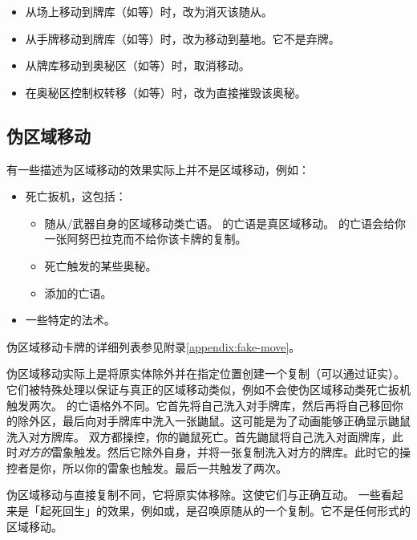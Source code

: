 \begin{itemize}
    \item 从场上移动到牌库（如等）时，改为消灭该随从。
    \item 从手牌移动到牌库（如等）时，改为移动到墓地。它不是弃牌。
\end{itemize}

\begin{itemize}
    \item 从牌库移动到奥秘区（如等）时，取消移动。
    \item 在奥秘区控制权转移（如等）时，改为直接摧毁该奥秘。
\end{itemize}

\subsection{伪区域移动}

有一些描述为区域移动的效果实际上并不是区域移动，例如：

\begin{itemize}
    \item 死亡扳机，这包括：
    \begin{itemize}
        \item 随从/武器自身的区域移动类亡语。
            \exception {}的亡语是真区域移动。
            \exception {}的亡语会给你一张阿努巴拉克而不给你该卡牌的复制。
        \item 死亡触发的某些奥秘。
        \item {}添加的亡语。
    \end{itemize}
    \item 一些特定的法术。
\end{itemize}
伪区域移动卡牌的详细列表参见附录\ref{appendix:fake-move}。

伪区域移动实际上是将原实体除外并在指定位置创建一个复制（可以通过证实）。它们被特殊处理以保证与真正的区域移动类似，例如不会使伪区域移动类死亡扳机触发两次。
\exception {}的亡语格外不同。它首先将自己洗入对手牌库，然后再将自己移回你的除外区，最后向对手牌库中洗入一张鼬鼠。这可能是为了动画能够正确显示鼬鼠洗入对方牌库。
\example 双方都操控，你的鼬鼠死亡。首先鼬鼠将自己洗入对面牌库，此时\emph{对方的}雷象触发。然后它除外自身，并将一张复制洗入对方的牌库。此时它的操控者是你，所以你的雷象也触发。最后一共触发了两次。

\notice 伪区域移动与直接复制不同，它将原实体移除。这使它们与正确互动。
\notice 一些看起来是「起死回生」的效果，例如或，是召唤原随从的一个复制。它不是任何形式的区域移动。

